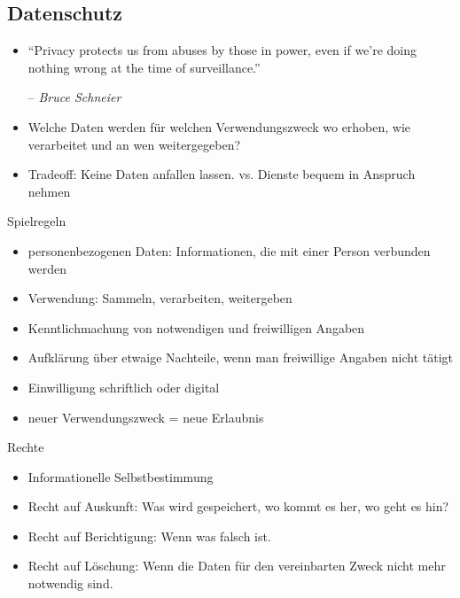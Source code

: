 \documentclass[hyperref={colorlinks,linkcolor=white}, utf8]{beamer}
\begin{document}
	\subsection{Datenschutz}
	\begin{frame} 
		\begin{itemize}
			\item{\enquote{Privacy protects us from abuses by those in power, even if we’re doing nothing wrong at the time of surveillance.}
				
			-- \emph{Bruce Schneier}}
			\item Welche Daten werden für welchen Verwendungszweck wo erhoben, wie verarbeitet und an wen weitergegeben?
			\item Tradeoff: Keine Daten anfallen lassen. vs. Dienste bequem in Anspruch nehmen
		\end{itemize}
	\end{frame}
	
	\begin{frame}{Spielregeln}
		\begin{itemize}
			\item personenbezogenen Daten: Informationen, die mit einer Person verbunden werden
			\item Verwendung: Sammeln, verarbeiten, weitergeben
			\item Kenntlichmachung von notwendigen und freiwilligen Angaben
			\item Aufklärung über etwaige Nachteile, wenn man freiwillige Angaben nicht tätigt
			\item Einwilligung schriftlich oder digital
			\item neuer Verwendungszweck = neue Erlaubnis
		\end{itemize}
	\end{frame}
	
	\begin{frame}{Rechte}
		\begin{itemize}
			\item Informationelle Selbstbestimmung
			\item Recht auf Auskunft: Was wird gespeichert, wo kommt es her, wo geht es hin?
			\item Recht auf Berichtigung: Wenn was falsch ist.
			\item Recht auf Löschung: Wenn die Daten für den vereinbarten Zweck nicht mehr notwendig sind.
		\end{itemize}
	\end{frame}
	
\end{document}
